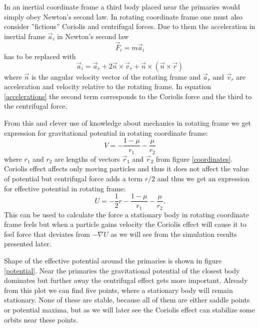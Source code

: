 \documentclass[12pt,a4paper,titlepage]{article}
\begin{document}
In an inertial coordinate frame a third body placed near the primaries would simply obey Newton's second law. In rotating coordinate frame one must also consider ''fictious'' Coriolis and centrifugal forces. Due to them the acceleration in inertial frame $\vec a_{i}$ in Newton's second law
\begin{equation}
	\vec F_i = m\vec a_i
\end{equation}
has to be replaced with
\begin{equation}\label{accelerations}
	\vec a_i = \vec a_r + 2\vec n \times \vec v_{r} + \vec n \times ( \vec n \times \vec r)
\end{equation}
where $\vec n$ is the angular velocity vector of the rotating frame and $\vec a_r$ and $\vec v_r$ are acceleration and velocity relative to the rotating frame. In equation \ref{accelerations} the second term corresponds to the Coriolis force and the third to the centrifugal force. \cite{dj}

From this and clever use of knowledge about mechanics in rotating frame we get expression for gravitational potential in rotating coordinate frame:
\begin{equation}
	V = -\frac{1-\mu}{r_1} - \frac{\mu}{r_2}
\end{equation}
where $r_1$ and $r_2$ are lengths of vectors $\vec r_1$ and $\vec r_2$ from figure \ref{coordinates}. Coriolis effect affects only moving particles and thus it does not affect the value of potential but centrifugal force adds a term $r/2$ and thus we get an expression for effective potential in rotating frame:
\begin{equation}
	U = -\frac{1}{2}r - \frac{1-\mu}{r_1} - \frac{\mu}{r_2}.
\end{equation}
This can be used to calculate the force a stationary body in rotating coordinate frame feels but when a particle gains velocity the Coriolis effect will cause it to feel force that deviates from $-\nabla U$ as we will see from the simulation results presented later. \cite{dj}

Shape of the effective potential around the primaries is shown in figure \ref{potential}. Near the primaries the gravitational potential of the closest body dominates but further away the centrifugal effect gets more important. Already from this plot we can find five points, where a stationary body will remain stationary. None of these are stable, because all of them are either saddle points or potential maxima, but as we will later see the Coriolis effect can stabilize some orbits near these points. \cite{dj}
\end{document}
